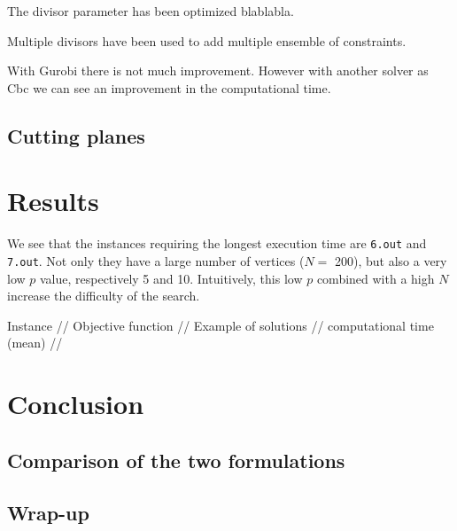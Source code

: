 \documentclass[a4paper,10pt]{article}
\begin{document}
The divisor parameter has been optimized blablabla.





Multiple divisors have been used to add multiple ensemble of constraints.

With Gurobi there is not much improvement. However with another solver as Cbc we can see an improvement in the computational time. 

\subsection{Cutting planes}


\section{Results}


We see that the instances requiring the longest execution time are \texttt{6.out} and \texttt{7.out}. Not only they have a large number of vertices ($N = $ 200), but also a very low $p$ value, respectively 5 and 10. Intuitively, this low $p$ combined with a high $N$ increase the difficulty of the search.

 Instance // Objective function // Example of solutions  // computational time (mean) //



\section{Conclusion}
	\subsection{Comparison of the two formulations}
	\subsection{Wrap-up}
	
\end{document}
